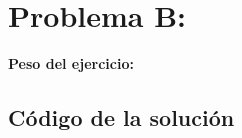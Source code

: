 \newpage{}
\section{Problema B:  }
\textbf{Peso del ejercicio: }


\newpage
\subsection{Código de la solución}
\lstset{inputencoding=utf8/latin1}

